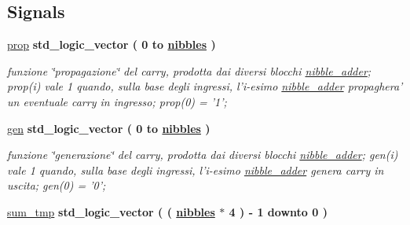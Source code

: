\subsection*{Signals}
 \begin{DoxyCompactItemize}
\item 
\hyperlink{group___carry_loockahead_ga19afe0b89973d7fc29362431f2e828b7}{prop} {\bfseries \textcolor{vhdlchar}{std\+\_\+logic\+\_\+vector}\textcolor{vhdlchar}{ }\textcolor{vhdlchar}{(}\textcolor{vhdlchar}{ }\textcolor{vhdlchar}{ } \textcolor{vhdldigit}{0} \textcolor{vhdlchar}{ }\textcolor{vhdlchar}{to}\textcolor{vhdlchar}{ }\textcolor{vhdlchar}{ }\textcolor{vhdlchar}{ }\textcolor{vhdlchar}{ }{\bfseries \hyperlink{group___carry_loockahead_ga0b63b586531492d0fa882246cca071c1}{nibbles}} \textcolor{vhdlchar}{ }\textcolor{vhdlchar}{)}\textcolor{vhdlchar}{ }} 
\begin{DoxyCompactList}\small\item\em funzione \char`\"{}propagazione\char`\"{} del carry, prodotta dai diversi blocchi \hyperlink{classnibble__adder}{nibble\+\_\+adder}; prop(i) vale 1 quando, sulla base degli ingressi, l'i-\/esimo \hyperlink{classnibble__adder}{nibble\+\_\+adder} propaghera' un eventuale carry in ingresso; prop(0) = '1'; \end{DoxyCompactList}\item 
\hyperlink{group___carry_loockahead_ga7a68948b7b96c7b51036939fad8e71b3}{gen} {\bfseries \textcolor{vhdlchar}{std\+\_\+logic\+\_\+vector}\textcolor{vhdlchar}{ }\textcolor{vhdlchar}{(}\textcolor{vhdlchar}{ }\textcolor{vhdlchar}{ } \textcolor{vhdldigit}{0} \textcolor{vhdlchar}{ }\textcolor{vhdlchar}{to}\textcolor{vhdlchar}{ }\textcolor{vhdlchar}{ }\textcolor{vhdlchar}{ }\textcolor{vhdlchar}{ }{\bfseries \hyperlink{group___carry_loockahead_ga0b63b586531492d0fa882246cca071c1}{nibbles}} \textcolor{vhdlchar}{ }\textcolor{vhdlchar}{)}\textcolor{vhdlchar}{ }} 
\begin{DoxyCompactList}\small\item\em funzione \char`\"{}generazione\char`\"{} del carry, prodotta dai diversi blocchi \hyperlink{classnibble__adder}{nibble\+\_\+adder}; gen(i) vale 1 quando, sulla base degli ingressi, l'i-\/esimo \hyperlink{classnibble__adder}{nibble\+\_\+adder} genera carry in uscita; gen(0) = '0'; \end{DoxyCompactList}\item 
\hyperlink{group___carry_loockahead_ga99974841945a5f91b014f0149e173356}{sum\+\_\+tmp} {\bfseries \textcolor{vhdlchar}{std\+\_\+logic\+\_\+vector}\textcolor{vhdlchar}{ }\textcolor{vhdlchar}{(}\textcolor{vhdlchar}{ }\textcolor{vhdlchar}{(}\textcolor{vhdlchar}{ }\textcolor{vhdlchar}{ }\textcolor{vhdlchar}{ }\textcolor{vhdlchar}{ }{\bfseries \hyperlink{group___carry_loockahead_ga0b63b586531492d0fa882246cca071c1}{nibbles}} \textcolor{vhdlchar}{$\ast$}\textcolor{vhdlchar}{ } \textcolor{vhdldigit}{4} \textcolor{vhdlchar}{ }\textcolor{vhdlchar}{)}\textcolor{vhdlchar}{ }\textcolor{vhdlchar}{-\/}\textcolor{vhdlchar}{ } \textcolor{vhdldigit}{1} \textcolor{vhdlchar}{ }\textcolor{vhdlchar}{downto}\textcolor{vhdlchar}{ }\textcolor{vhdlchar}{ } \textcolor{vhdldigit}{0} \textcolor{vhdlchar}{ }\textcolor{vhdlchar}{)}\textcolor{vhdlchar}{ }} 

\end{DoxyCompactItemize}
